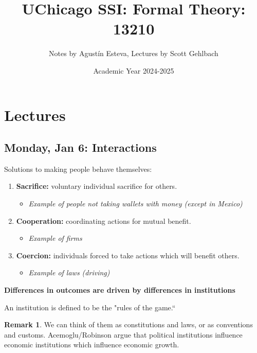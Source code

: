 \documentclass[10pt, oneside]{article}
\title{UChicago SSI: Formal Theory: 13210}
\author{Notes by Agustín Esteva, Lectures by Scott Gehlbach}
\date{Academic Year 2024-2025}
\theoremstyle{definition}
\newtheorem{rem}{Remark}
\begin{document}
\maketitle
\tableofcontents

\vspace{.25in}

\section{Lectures}

\subsection{Monday, Jan 6: Interactions}
Solutions to making people behave themselves:
\begin{enumerate}
    \item \textbf{Sacrifice:} voluntary individual sacrifice for others.
    \begin{itemize}
        \item \textit{Example of people not taking wallets with money (except in Mexico)}
    \end{itemize}
    \item \textbf{Cooperation:} coordinating actions for mutual benefit.
    \begin{itemize}
        \item \textit{Example of firms}
    \end{itemize}
    \item \textbf{Coercion:} individuals forced to take actions which will benefit others.
    \begin{itemize}
        \item \textit{Example of laws (driving)}
    \end{itemize}
\end{enumerate}
\textbf{Differences in outcomes are driven by differences in institutions}
\begin{def}
    An institution is defined to be the "rules of the game.``
\end{def}
\begin{rem}
    We can think of them as constitutions and laws, or as conventions and customs. Acemoglu/Robinson argue that political institutions influence economic institutions which influence economic growth.
\end{rem}
\end{document}
